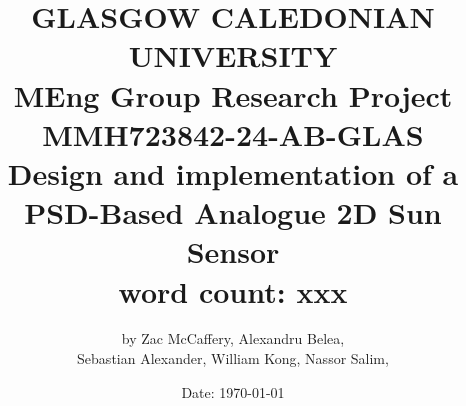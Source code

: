 \title{
    {\LARGE\textbf{GLASGOW CALEDONIAN UNIVERSITY}} \\
    \vspace{1.5cm}
    {\LARGE MEng Group Research Project } \\
    \vspace{0.5cm}
    {\LARGE MMH723842-24-AB-GLAS} \\
    \vspace{1.5cm}
    {\LARGE\textbf{Design and implementation of a PSD-Based Analogue 2D Sun Sensor}} \\
    \vspace{0.5cm}
    {\large word count: xxx} \\
}

\author{
    by Zac McCaffery, Alexandru Belea,  \\
    Sebastian Alexander, William Kong, Nassor Salim,
}

\date{
    Date: \today
}

